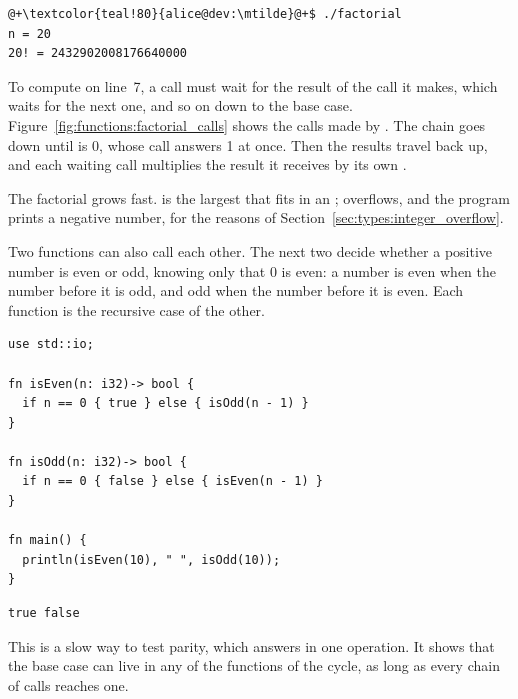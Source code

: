 
\vspace{-10pt}%
\begin{lstlisting}[style=bashVerb, escapechar=@+]
@+\textcolor{teal!80}{alice@dev:\mtilde}@+$ ./factorial
n = 20
20! = 2432902008176640000
\end{lstlisting}

To compute  on line~7, a call must wait for the
result of the call it makes, which waits for the next one, and so on down to the
base case. Figure~\ref{fig:functions:factorial_calls} shows the calls made by
. The chain goes down until  is 0, whose call
answers 1 at once. Then the results travel back up, and each waiting call
multiplies the result it receives by its own .



The factorial grows fast.  is the largest that fits in an
;  overflows, and the program prints a negative
number, for the reasons of Section~\ref{sec:types:integer_overflow}.

Two functions can also call each other. The next two decide whether a positive
number is even or odd, knowing only that 0 is even: a number is even when the
number before it is odd, and odd when the number before it is even. Each
function is the recursive case of the other.

\begin{lstlisting}[style=coloredverbatim, caption=Two functions calling each other, label=lst:functions:parity]
use std::io;

fn isEven(n: i32)-> bool {
  if n == 0 { true } else { isOdd(n - 1) }
}

fn isOdd(n: i32)-> bool {
  if n == 0 { false } else { isEven(n - 1) }
}

fn main() {
  println(isEven(10), " ", isOdd(10));
}
\end{lstlisting}
\vspace{-10pt}%
\begin{lstlisting}[style=bashVerb]
true false
\end{lstlisting}

This is a slow way to test parity, which  answers in one
operation. It shows that the base case can live in any of the functions of the
cycle, as long as every chain of calls reaches one.

